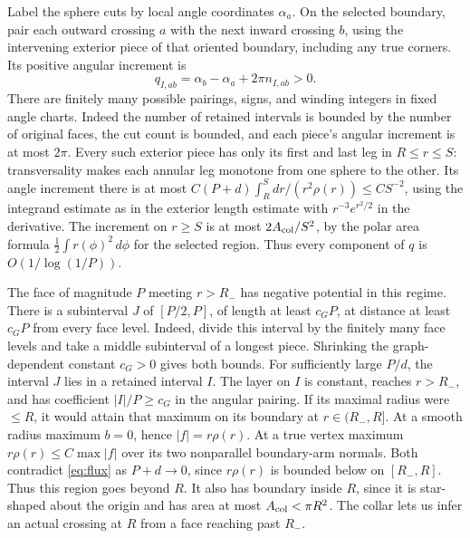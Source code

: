Label the sphere cuts by local angle coordinates \(\alpha_a\). On the selected boundary, pair each outward crossing \(a\) with the next inward crossing \(b\), using the intervening exterior piece of that oriented boundary, including any true corners. Its positive angular increment is \[
 q_{I,ab}=\alpha_b-\alpha_a+2\pi n_{I,ab}>0.
\] There are finitely many possible pairings, signs, and winding integers in fixed angle charts. Indeed the number of retained intervals is bounded by the number of original faces, the cut count is bounded, and each piece's angular increment is at most \(2\pi\). Every such exterior piece has only its first and last leg in \(R\le r\le S\): transversality makes each annular leg monotone from one sphere to the other. Its angle increment there is at most \(C(P+d)\int_R^S dr/(r^2\rho(r))\le C S^{-2}\), using the integrand estimate as in the exterior length estimate with \(r^{-3}e^{r^2/2}\) in the derivative. The increment on \(r\ge S\) is at most \(2 A_{\rm col}/S^2\), by the polar area formula \(\frac12\int r(\phi)^2\,d\phi\) for the selected region. Thus every component of \(q\) is \(O(1/\log(1/P))\).

The face of magnitude \(P\) meeting \(r>R_-\) has negative potential in this regime. There is a subinterval \(J\) of \([P/2,P]\), of length at least \(c_G P\), at distance at least \(c_G P\) from every face level. Indeed, divide this interval by the finitely many face levels and take a middle subinterval of a longest piece. Shrinking the graph-dependent constant \(c_G>0\) gives both bounds. For sufficiently large \(P/d\), the interval \(J\) lies in a retained interval \(I\). The layer on \(I\) is constant, reaches \(r>R_-\), and has coefficient \(|I|/P\ge c_G\) in the angular pairing. If its maximal radius were \(\le R\), it would attain that maximum on its boundary at \(r\in(R_-,R]\). At a smooth radius maximum \(b=0\), hence \(|f|=r\rho(r)\). At a true vertex maximum \(r\rho(r)\le C\max |f|\) over its two nonparallel boundary-arm normals. Both contradict \eqref{eq:flux} as \(P+d\to0\), since \(r\rho(r)\) is bounded below on \([R_-,R]\). Thus this region goes beyond \(R\). It also has boundary inside \(R\), since it is star-shaped about the origin and has area at most \(A_{\rm col}<\pi R^2\). The collar lets us infer an actual crossing at \(R\) from a face reaching past \(R_-\).

